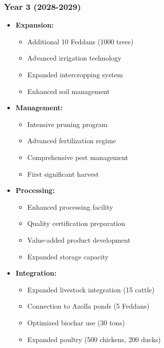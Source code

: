 \subsubsection{Year 3 (2028-2029)}
\begin{itemize}
    \item \textbf{Expansion:}
    \begin{itemize}
        \item Additional 10 Feddans (1000 trees)
        \item Advanced irrigation technology
        \item Expanded intercropping system
        \item Enhanced soil management
    \end{itemize}
    \item \textbf{Management:}
    \begin{itemize}
        \item Intensive pruning program
        \item Advanced fertilization regime
        \item Comprehensive pest management
        \item First significant harvest
    \end{itemize}
    \item \textbf{Processing:}
    \begin{itemize}
        \item Enhanced processing facility
        \item Quality certification preparation
        \item Value-added product development
        \item Expanded storage capacity
    \end{itemize}
    \item \textbf{Integration:}
    \begin{itemize}
        \item Expanded livestock integration (15 cattle)
        \item Connection to Azolla ponds (5 Feddans)
        \item Optimized biochar use (30 tons)
        \item Expanded poultry (500 chickens, 200 ducks)
    \end{itemize}
\end{itemize}

